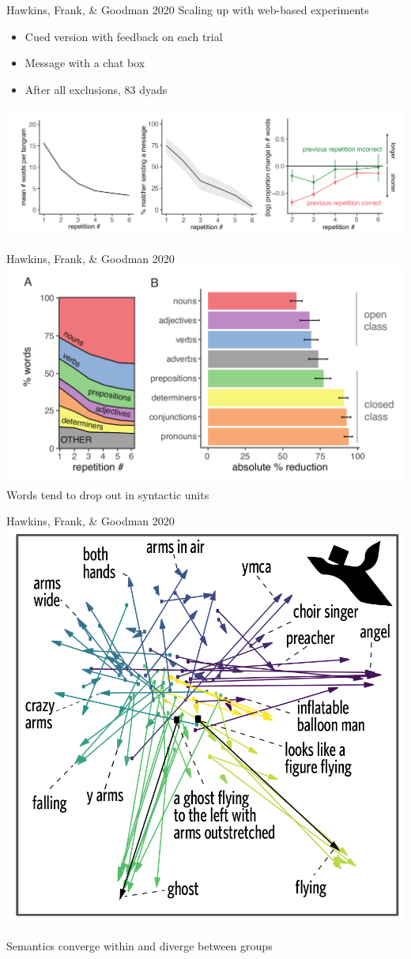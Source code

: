 \documentclass[12pt, xcolor=beamer,table,usenames,dvipsnames, ignorenonframetext, ngerman,t]{beamer}
\begin{document}
%
\begin{frame}{Hawkins, Frank, \& Goodman 2020}
Scaling up with web-based experiments
\begin{itemize}
	\item Cued version with feedback on each trial \pause
	\item Message with a chat box \pause
	\item After all exclusions, 83 dyads \pause
\end{itemize}
\includegraphics[width=\textwidth]{images/hawkins_fewer_words.png}
\end{frame}
%
\begin{frame}{Hawkins, Frank, \& Goodman 2020}
\includegraphics[width=\textwidth]{images/hawkins_pos.png}
Words tend to drop out in syntactic units
\end{frame}

\begin{frame}{Hawkins, Frank, \& Goodman 2020}
	\includegraphics[width=.6\textwidth]{images/hawkins_semantics.png}
	
	Semantics converge within and diverge between groups
\end{frame}
\end{document}
